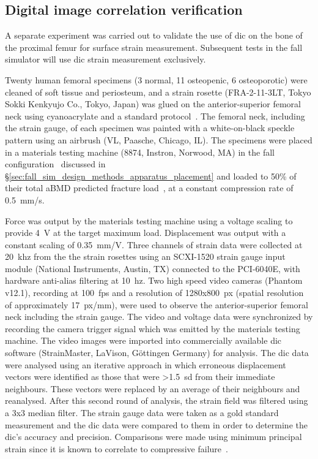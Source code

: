 	\subsection{Digital image correlation verification}
	\label{sec:fall_sim_design_methods_dic}
	A separate experiment was carried out to validate the use of \ac{dic} on the bone of the proximal femur for surface strain measurement.
	Subsequent tests in the fall simulator will use \ac{dic} strain measurement exclusively.
	
	Twenty human femoral specimens (3 normal, 11 osteopenic, 6 osteoporotic) were cleaned of soft tissue and periosteum, and a strain rosette (FRA-2-11-3LT, Tokyo Sokki Kenkyujo Co., Tokyo, Japan) was glued on the anterior-superior femoral neck using cyanoacrylate and a standard protocol~\citep[Chapter:~Strain gauge analysis of hard tissues: factors influencing measurements]{little_experimental_1992}.
	The femoral neck, including the strain gauge, of each specimen was painted with a white-on-black speckle pattern using an airbrush (VL, Paasche, Chicago, IL).
	The specimens were placed in a materials testing machine (8874, Instron, Norwood, MA) in the fall configuration~\citep{de_bakker_during_2009} discussed in \S\ref{sec:fall_sim_design_methods_apparatus_placement} and loaded to 50\% of their total aBMD predicted fracture load~\citep{boehm_prediction_2008}, at a constant compression rate of 0.5~\ac{mm}/\ac{s}.
	
	Force was output by the materials testing machine using a voltage scaling to provide 4~V at the target maximum load.
	Displacement was output with a constant scaling of 0.35~\ac{mm}/V.
	Three channels of strain data were collected at 20~\ac{khz} from the the strain rosettes using an SCXI-1520 strain gauge input module (National Instruments, Austin, TX) connected to the PCI-6040E, with hardware anti-alias filtering at 10~\ac{hz}.
	Two high speed video cameras (Phantom v12.1), recording at 100~fps and a resolution of 1280x800~\ac{px} (spatial resolution of approximately 17~\ac{px}/\ac{mm}), were used to observe the anterior-superior femoral neck including the strain gauge.	
	The video and voltage data were synchronized by recording the camera trigger signal which was emitted by the materials testing machine.
	The video images were imported into commercially available \ac{dic} software (StrainMaster, LaVison, G\"{o}ttingen Germany) for analysis.
	The \ac{dic} data were analysed using an iterative approach in which erroneous displacement vectors were identified as those that were \textgreater1.5~\ac{sd} from their immediate neighbours.
	These vectors were replaced by an average of their neighbours and reanalysed.
	After this second round of analysis, the strain field was filtered using a 3x3 median filter.
	The strain gauge data were taken as a gold standard measurement and the \ac{dic} data were compared to them in order to determine the \ac{dic}'s accuracy and precision.
	Comparisons were made using minimum principal strain since it is known to correlate to compressive failure~\citep{bayraktar_comparison_2004}.

